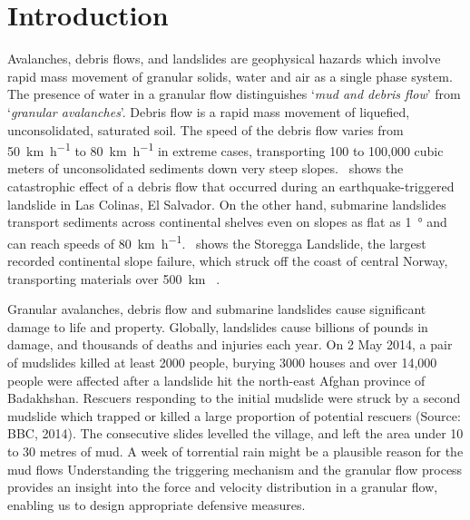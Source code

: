 \chapter{Introduction}

\ifpdf
    \graphicspath{{Chapter1/figs/raster/}{Chapter1/figs/pdf/}{Chapter1/figs/}}
\else
    \graphicspath{{Chapter1/figs/vector/}{Chapter1/figs/}}
\fi

Avalanches, debris flows, and landslides are geophysical hazards which involve 
rapid mass movement of granular solids, water and air as a single phase system. 
The presence of water in a granular flow distinguishes `\textit{mud and debris 
flow}' from `\textit{granular avalanches}'. Debris flow is a rapid mass 
movement of liquefied, unconsolidated, saturated soil. The speed of the debris 
flow varies from \SI{50}{\km\per\hour} to \SI{80}{\km\per\hour} in extreme 
cases, transporting 100 to 100,000 cubic meters of unconsolidated sediments 
down very 
steep slopes.~ shows the catastrophic effect of a debris flow 
that occurred during an earthquake-triggered landslide in Las Colinas,  El 
Salvador. On the other hand, submarine landslides transport sediments across 
continental shelves even on slopes as flat as \SI{1}{\degree} and can reach 
speeds of \SI{80}{\km\per\hour}.~ shows the Storegga 
Landslide, the largest recorded continental slope failure, which struck off the 
coast of central Norway, transporting materials over \SI{500}{\km} 
~\citep{Ward2002}. 

Granular avalanches, debris flow and submarine landslides cause significant 
damage to life and property. Globally, landslides cause billions of pounds in 
damage, and thousands of deaths and injuries each year. On 2 May 2014, a pair 
of mudslides killed at least 2000 people, burying 3000 houses and over 14,000 
people were affected after a landslide hit the north-east Afghan province of 
Badakhshan. Rescuers responding to the initial mudslide were struck by a second 
mudslide which trapped or killed a large proportion of potential rescuers 
(Source: BBC, 2014). The consecutive slides levelled the village, and left the 
area under 10 to 30 metres of mud. A week of torrential rain might be a 
plausible reason for the mud flows Understanding the triggering mechanism and 
the granular flow process provides an insight into the force and velocity 
distribution in a granular flow, enabling us to design appropriate defensive 
measures. 

